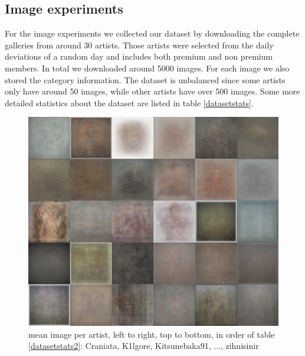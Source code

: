 \subsection{Image experiments}
For the image experiments we collected our dataset by downloading the complete galleries from around 30 artists.
Those artists were selected from the daily deviations of a random day and includes both premium and non premium members.
In total we downloaded around 5000 images. 
For each image we also stored the category information.
The dataset is unbalanced since some artists only have around 50 images, while other artists have over 500 images.
Some more detailed statistics about the dataset are listed in table \ref{datasetstats}.


\begin{figure}[htb]
  \includegraphics[width=1\linewidth]{img/datasetAvg.png}
  \caption{mean image per artist, left to right, top to bottom, in order of table \ref{datasetstats2}: Craniata, K1lgore, Kitsunebaka91, ..., zihnisinir }
  \label{fig:avgDataset}
\end{figure}


